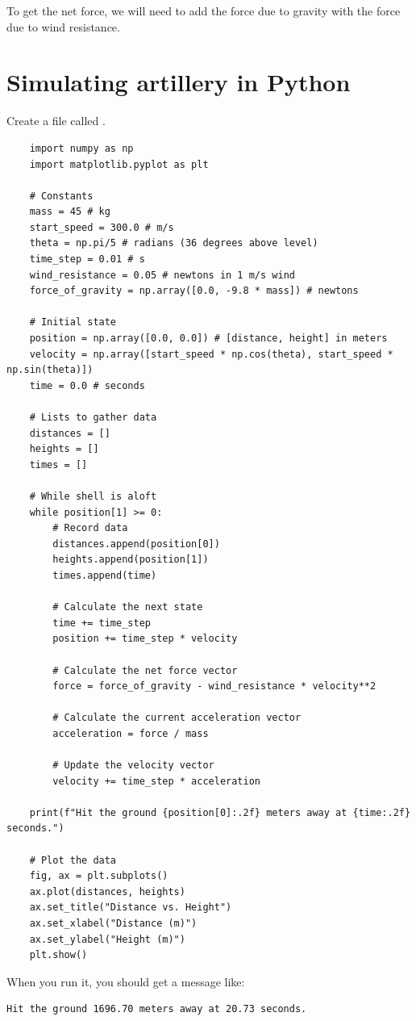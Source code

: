 To get the net force, we will need to add the force due to gravity
with the force due to wind resistance.
\section{Simulating artillery in Python}

Create a file called .

\begin{Verbatim}
    import numpy as np
    import matplotlib.pyplot as plt
    
    # Constants
    mass = 45 # kg
    start_speed = 300.0 # m/s
    theta = np.pi/5 # radians (36 degrees above level)
    time_step = 0.01 # s
    wind_resistance = 0.05 # newtons in 1 m/s wind
    force_of_gravity = np.array([0.0, -9.8 * mass]) # newtons
    
    # Initial state
    position = np.array([0.0, 0.0]) # [distance, height] in meters
    velocity = np.array([start_speed * np.cos(theta), start_speed * np.sin(theta)])
    time = 0.0 # seconds
    
    # Lists to gather data
    distances = []
    heights = []
    times = []
    
    # While shell is aloft
    while position[1] >= 0:
        # Record data
        distances.append(position[0])
        heights.append(position[1])
        times.append(time)
    
        # Calculate the next state
        time += time_step
        position += time_step * velocity
    
        # Calculate the net force vector
        force = force_of_gravity - wind_resistance * velocity**2
    
        # Calculate the current acceleration vector
        acceleration = force / mass
    
        # Update the velocity vector   
        velocity += time_step * acceleration
    
    print(f"Hit the ground {position[0]:.2f} meters away at {time:.2f} seconds.")
    
    # Plot the data
    fig, ax = plt.subplots()
    ax.plot(distances, heights)
    ax.set_title("Distance vs. Height")
    ax.set_xlabel("Distance (m)")
    ax.set_ylabel("Height (m)")
    plt.show()        
\end{Verbatim}

When you run it, you should get a message like:
\begin{Verbatim}
Hit the ground 1696.70 meters away at 20.73 seconds.
\end{Verbatim}

